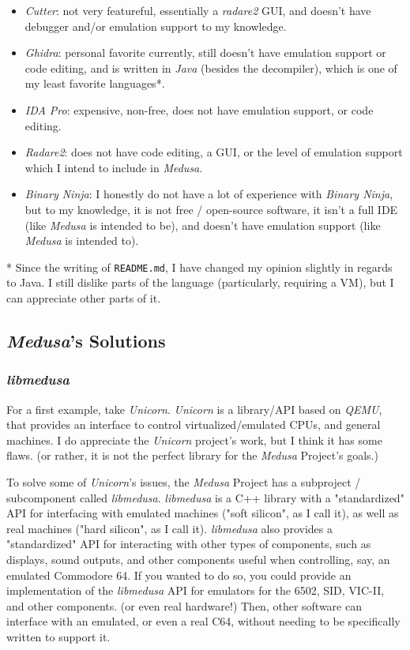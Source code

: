 \documentclass{article}
\begin{document}
	\begin{itemize}
		\item \textit{Cutter}: not very featureful, essentially a
		\textit{radare2} GUI, and doesn't have debugger and/or emulation support
		to my knowledge.
		\item \textit{Ghidra}: personal favorite currently, still doesn't have
		emulation support or code editing, and is written in \textit{Java}
		(besides the decompiler), which is one of my least favorite languages*.
		\item \textit{IDA Pro}: expensive, non-free, does not have emulation
		support, or code editing.
		\item \textit{Radare2}: does not have code editing, a GUI, or the level
		of emulation support which I intend to include in \textit{Medusa}.
		\item \textit{Binary Ninja}: I honestly do not have a lot of experience
		with \textit{Binary Ninja}, but to my knowledge, it is not free / 
		open-source software, it isn't a full IDE (like \textit{Medusa} is
		intended to be), and doesn't have emulation support (like
		\textit{Medusa} is intended to).
	\end{itemize}

	* Since the writing of \texttt{README.md}, I have changed my opinion slightly
	in regards to Java. I still dislike parts of the language (particularly,
	requiring a VM), but I can appreciate other parts of it.

	\subsection{\textit{Medusa}'s Solutions}
	\subsubsection{\textit{libmedusa}}
	For a first example, take \textit{Unicorn}. \textit{Unicorn} is a
	library/API based on \textit{QEMU}, that provides an interface to control
	virtualized/emulated CPUs, and general machines. I do appreciate the
	\textit{Unicorn} project's work, but I think it has some flaws. (or rather,
	it is not the perfect library for the \textit{Medusa} Project's goals.)

	To solve some of \textit{Unicorn}'s issues, the \textit{Medusa} Project has
	a subproject / subcomponent called \textit{libmedusa}. \textit{libmedusa} is
	a C++ library with a "standardized" API for interfacing with emulated
	machines ("soft silicon", as I call it), as well as real machines ("hard
	silicon", as I call it). \textit{libmedusa} also provides a "standardized"
	API for interacting with other types of components, such as displays, sound
	outputs, and other components useful when controlling, say, an emulated
	Commodore 64. If you wanted to do so, you could provide an implementation of
	the \textit{libmedusa} API for emulators for the 6502, SID, VIC-II, and
	other components. (or even real hardware!) Then, other software can
	interface with an emulated, or even a real C64, without needing to be
	specifically written to support it.
\end{document}
